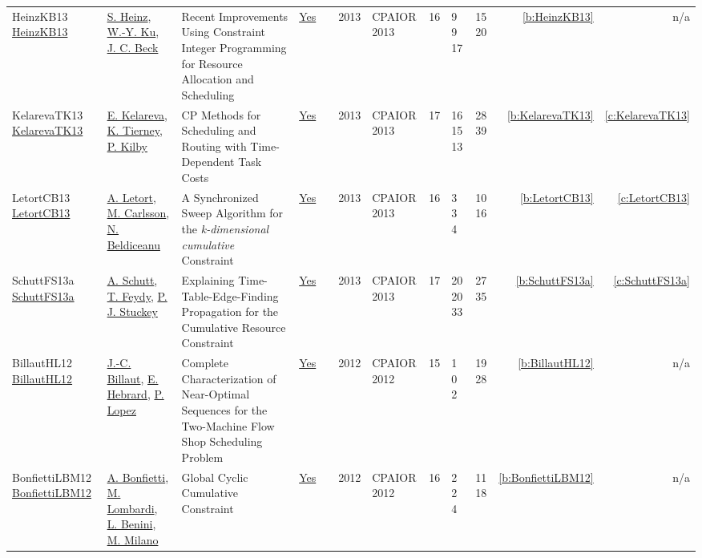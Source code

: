 {\begin{longtable}{>{\raggedright\arraybackslash}p{3cm}>{\raggedright\arraybackslash}p{4.5cm}>{\raggedright\arraybackslash}p{6.0cm}rrrp{2.5cm}rp{1cm}p{1cm}rr}
HeinzKB13 \href{https://doi.org/10.1007/978-3-642-38171-3_2}{HeinzKB13} & \hyperref[auth:a133]{S. Heinz}, \hyperref[auth:a331]{W.-Y. Ku}, \hyperref[auth:a89]{J. C. Beck} & Recent Improvements Using Constraint Integer Programming for Resource Allocation and Scheduling & \href{../works/HeinzKB13.pdf}{Yes} & \cite{HeinzKB13} & 2013 & CPAIOR 2013 & 16 & 9 9 17 & 15 20 & \ref{b:HeinzKB13} & n/a\\
KelarevaTK13 \href{https://doi.org/10.1007/978-3-642-38171-3_8}{KelarevaTK13} & \hyperref[auth:a332]{E. Kelareva}, \hyperref[auth:a333]{K. Tierney}, \hyperref[auth:a334]{P. Kilby} & {CP} Methods for Scheduling and Routing with Time-Dependent Task Costs & \href{../works/KelarevaTK13.pdf}{Yes} & \cite{KelarevaTK13} & 2013 & CPAIOR 2013 & 17 & 16 15 13 & 28 39 & \ref{b:KelarevaTK13} & \ref{c:KelarevaTK13}\\
LetortCB13 \href{https://doi.org/10.1007/978-3-642-38171-3_10}{LetortCB13} & \hyperref[auth:a127]{A. Letort}, \hyperref[auth:a91]{M. Carlsson}, \hyperref[auth:a128]{N. Beldiceanu} & A Synchronized Sweep Algorithm for the \emph{k-dimensional cumulative} Constraint & \href{../works/LetortCB13.pdf}{Yes} & \cite{LetortCB13} & 2013 & CPAIOR 2013 & 16 & 3 3 4 & 10 16 & \ref{b:LetortCB13} & \ref{c:LetortCB13}\\
SchuttFS13a \href{https://doi.org/10.1007/978-3-642-38171-3_16}{SchuttFS13a} & \hyperref[auth:a124]{A. Schutt}, \hyperref[auth:a154]{T. Feydy}, \hyperref[auth:a125]{P. J. Stuckey} & \cellcolor{green!10}Explaining Time-Table-Edge-Finding Propagation for the Cumulative Resource Constraint & \href{../works/SchuttFS13a.pdf}{Yes} & \cite{SchuttFS13a} & 2013 & CPAIOR 2013 & 17 & 20 20 33 & 27 35 & \ref{b:SchuttFS13a} & \ref{c:SchuttFS13a}\\
BillautHL12 \href{https://doi.org/10.1007/978-3-642-29828-8_5}{BillautHL12} & \hyperref[auth:a337]{J.-C. Billaut}, \hyperref[auth:a1]{E. Hebrard}, \hyperref[auth:a3]{P. Lopez} & \cellcolor{green!10}Complete Characterization of Near-Optimal Sequences for the Two-Machine Flow Shop Scheduling Problem & \href{../works/BillautHL12.pdf}{Yes} & \cite{BillautHL12} & 2012 & CPAIOR 2012 & 15 & 1 0 2 & 19 28 & \ref{b:BillautHL12} & n/a\\
BonfiettiLBM12 \href{https://doi.org/10.1007/978-3-642-29828-8_6}{BonfiettiLBM12} & \hyperref[auth:a198]{A. Bonfietti}, \hyperref[auth:a142]{M. Lombardi}, \hyperref[auth:a245]{L. Benini}, \hyperref[auth:a143]{M. Milano} & Global Cyclic Cumulative Constraint & \href{../works/BonfiettiLBM12.pdf}{Yes} & \cite{BonfiettiLBM12} & 2012 & CPAIOR 2012 & 16 & 2 2 4 & 11 18 & \ref{b:BonfiettiLBM12} & n/a\\

\end{longtable}}

